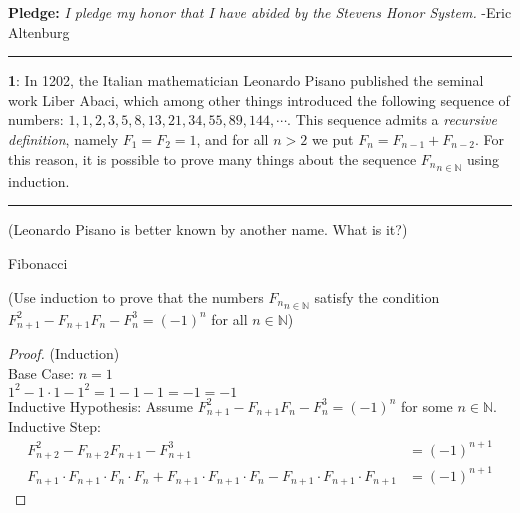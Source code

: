 \documentclass[11pt]{article}
\newcommand\question[2]{\vspace{.25in}\hrule\textbf{#1}: #2\vspace{.5em}\hrule\vspace{.10in}}
\renewcommand\part[1]{\vspace{.10in}(#1)\par}
\newcommand{\N}{\mathbb{N}}
\begin{document}
\raggedright
\newcommand\NAME{Eric Altenburg}  %
\newcommand\COURSE{MA-240}
\newcommand\HWNUM{6}              %


\textbf{Pledge:} \textit{I pledge my honor that I have abided by the Stevens Honor System.} -Eric Altenburg

\question{1}{In 1202, the Italian mathematician Leonardo Pisano published the seminal work Liber Abaci, which among other things introduced the following sequence of numbers: $1, 1, 2, 3, 5, 8, 13, 21, 34, 55, 89, 144, \cdots$. This sequence admits a \textit{recursive definition}, namely $F_1 = F_2 = 1$, and for all $n > 2$ we put $F_n = F_{n-1} + F_{n-2}$. For this reason, it is possible to prove many things about the sequence ${F_n}_{n \in \N}$ using induction.}

\part{Leonardo Pisano is better known by another name. What is it?}
	Fibonacci

\part{Use induction to prove that the numbers ${F_n}_{n \in \N}$ satisfy the condition $F^2_{n+1}-F_{n+1}F_n-F^3_n = (-1)^n$ for all $n \in \N$}
	\begin{proof}
		(Induction)\\
		Base Case: $n=1$\\	
		$1^2 - 1\cdot1-1^2 = 1-1-1 = -1 = -1$\\
		Inductive Hypothesis: Assume $F^2_{n+1}-F_{n+1}F_n-F^3_n = (-1)^n$ for some $n \in \N$.\\
		Inductive Step: 
		\begin{align*}
			F^2_{n+2}-F_{n+2}F_{n+1}-F^3_{n+1} &= (-1)^{n+1}\\
			F_{n+1} \cdot F_{n+1} \cdot F_n\cdot F_n + F_{n+1} \cdot F_{n+1} \cdot F_n - F_{n+1} \cdot F_{n+1} \cdot F_{n+1} &= (-1)^{n+1}
		\end{align*}
	\end{proof}
\end{document}
